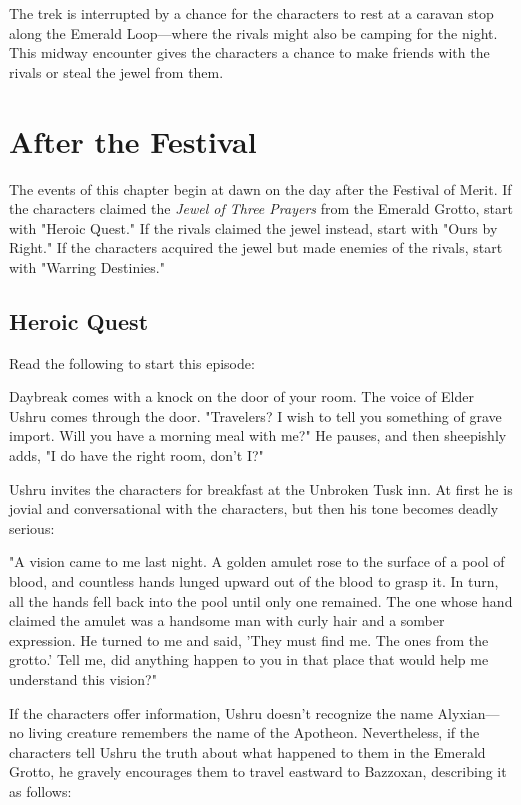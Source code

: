 \documentclass[10pt,a4paper,twoside,fancy,bg=print,twocolumn,openany,nodeprecatedcode]{dndbook}
\begin{document}
The trek is interrupted by a chance for the characters to rest at a caravan stop along the Emerald Loop—where the rivals might also be camping for the night. This midway encounter gives the characters a chance to make friends with the rivals or steal the jewel from them.

\section{After the Festival}
The events of this chapter begin at dawn on the day after the Festival of Merit. If the characters claimed the \textit{Jewel of Three Prayers} from the Emerald Grotto, start with "Heroic Quest." If the rivals claimed the jewel instead, start with "Ours by Right." If the characters acquired the jewel but made enemies of the rivals, start with "Warring Destinies."

\subsection{Heroic Quest}
Read the following to start this episode:

\begin{DndReadAloud}{}
Daybreak comes with a knock on the door of your room. The voice of Elder Ushru comes through the door. "Travelers? I wish to tell you something of grave import. Will you have a morning meal with me?" He pauses, and then sheepishly adds, "I do have the right room, don't I?"

\end{DndReadAloud}

Ushru invites the characters for breakfast at the Unbroken Tusk inn. At first he is jovial and conversational with the characters, but then his tone becomes deadly serious:

\begin{DndReadAloud}{}
"A vision came to me last night. A golden amulet rose to the surface of a pool of blood, and countless hands lunged upward out of the blood to grasp it. In turn, all the hands fell back into the pool until only one remained. The one whose hand claimed the amulet was a handsome man with curly hair and a somber expression. He turned to me and said, 'They must find me. The ones from the grotto.' Tell me, did anything happen to you in that place that would help me understand this vision?"

\end{DndReadAloud}

If the characters offer information, Ushru doesn't recognize the name Alyxian—no living creature remembers the name of the Apotheon. Nevertheless, if the characters tell Ushru the truth about what happened to them in the Emerald Grotto, he gravely encourages them to travel eastward to Bazzoxan, describing it as follows:
\end{document}

